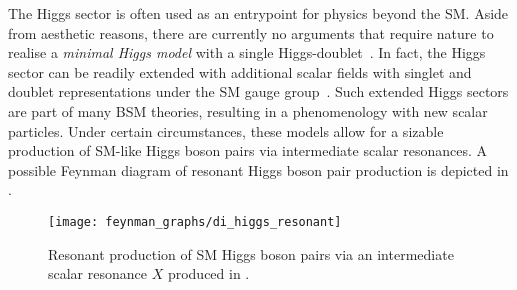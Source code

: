 The Higgs sector is often used as an entrypoint for physics beyond the SM. Aside
from aesthetic reasons, there are currently no arguments that require nature to
realise a \emph{minimal Higgs model} with a single
Higgs-doublet~\cite{Gunion:1989we}. In fact, the Higgs sector can be readily
extended with additional scalar fields with singlet and doublet representations
under the SM gauge group~\cite{Gunion:1989we}. Such extended Higgs sectors are
part of many BSM theories, resulting in a phenomenology with new scalar
particles. Under certain circumstances, these models allow for a sizable
production of SM-like Higgs boson pairs via intermediate scalar resonances. A
possible Feynman diagram of resonant Higgs boson pair production is depicted in
.

\begin{figure}[htbp]
  \centering

  \texttt{[image: feynman\_graphs/di\_higgs\_resonant]}

  \caption{Resonant production of SM Higgs boson pairs via an intermediate
    scalar resonance $X$ produced in \ggF.}%
  \label{fig:resonant_production_feyn}
\end{figure}

